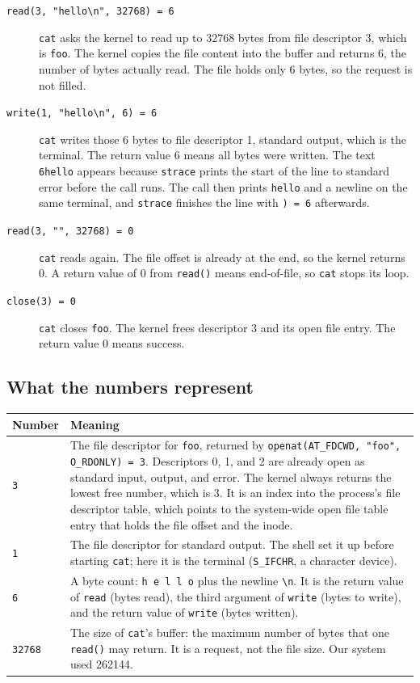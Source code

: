 \documentclass[11pt,a4paper]{article}
\newcommand{\code}[1]{\texttt{#1}}
\begin{document}
\begin{description}
    \item[\code{read(3, "hello\textbackslash n", 32768) = 6}] \code{cat} asks the
    kernel to read up to 32768 bytes from file descriptor 3, which is
    \code{foo}. The kernel copies the file content into the buffer and returns
    6, the number of bytes actually read. The file holds only 6 bytes, so the
    request is not filled.
    \item[\code{write(1, "hello\textbackslash n", 6) = 6}] \code{cat} writes
    those 6 bytes to file descriptor 1, standard output, which is the
    terminal. The return value 6 means all bytes were written. The text
    \code{6hello} appears because \code{strace} prints the start of the line
    to standard error before the call runs. The call then prints
    \code{hello} and a newline on the same terminal, and \code{strace} finishes
    the line with \code{) = 6} afterwards.
    \item[\code{read(3, "", 32768) = 0}] \code{cat} reads again. The file
    offset is already at the end, so the kernel returns 0. A return value of 0
    from \code{read()} means end-of-file, so \code{cat} stops its loop.
    \item[\code{close(3) = 0}] \code{cat} closes \code{foo}. The kernel frees
    descriptor 3 and its open file entry. The return value 0 means success.
\end{description}

\subsection{What the numbers represent}

\begin{center}
\begin{tabularx}{\linewidth}{@{}lX@{}}
\toprule
Number & Meaning \\
\midrule
\code{3} & The file descriptor for \code{foo}, returned by
\code{openat(AT\_FDCWD, "foo", O\_RDONLY) = 3}. Descriptors 0, 1, and 2 are
already open as standard input, output, and error. The kernel always returns
the lowest free number, which is 3. It is an index into the process's file
descriptor table, which points to the system-wide open file table entry that
holds the file offset and the inode. \\
\code{1} & The file descriptor for standard output. The shell set it up before
starting \code{cat}; here it is the terminal (\code{S\_IFCHR}, a character
device). \\
\code{6} & A byte count: \code{h e l l o} plus the newline \code{\textbackslash n}.
It is the return value of \code{read} (bytes read), the third argument of
\code{write} (bytes to write), and the return value of \code{write} (bytes
written). \\
\code{32768} & The size of \code{cat}'s buffer: the maximum number of bytes
that one \code{read()} may return. It is a request, not the file size. Our
system used 262144. \\
\bottomrule
\end{tabularx}
\end{center}
\end{document}
